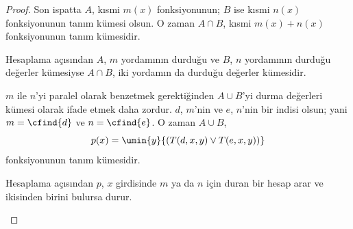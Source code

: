\begin{proof}
Son ispatta $A$, kısmi $m(x)$ fonksiyonunun; $B$ ise kısmi $n(x)$
fonksiyonunun tanım kümesi olsun. O zaman $A\cap B$, kısmi
$m(x)+n(x)$ fonksiyonunun tanım kümesidir.

\begin{explain}
Hesaplama açısından $A$, $m$ yordamının durduğu ve $B$, $n$ yordamının
durduğu değerler kümesiyse $A\cap B$, iki yordamın da durduğu değerler
kümesidir.
\end{explain}

$m$ ile $n$'yi paralel olarak benzetmek gerektiğinden $A\cup B$'yi durma
değerleri kümesi olarak ifade etmek daha zordur. $d$, $m$'nin ve $e$,
$n$'nin bir indisi olsun; yani $m=\cfind{d}$ ve $n=\cfind{e}$. O zaman
$A\cup B$,
\[
  p(x)=\umin{y}{(T(d,x,y)\lor T(e,x,y))}
\]
fonksiyonunun tanım kümesidir.
\begin{explain}
Hesaplama açısından $p$, $x$ girdisinde $m$ ya da $n$ için duran bir hesap
arar ve ikisinden birini bulursa durur.
\end{explain}
\end{proof}

